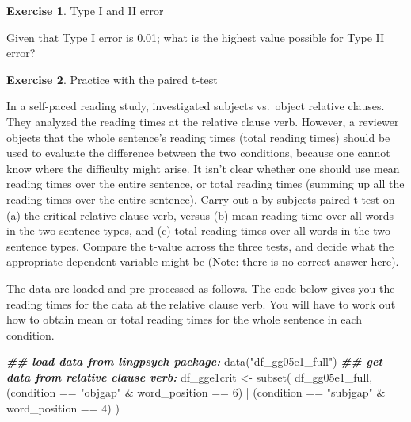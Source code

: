 \documentclass[
  12pt,
]{krantz}
\newenvironment{Shaded}{\begin{snugshade}}{\end{snugshade}}
\newcommand{\DecValTok}[1]{\textcolor[rgb]{0.00,0.00,0.81}{#1}}
\newcommand{\DocumentationTok}[1]{\textcolor[rgb]{0.56,0.35,0.01}{\textbf{\textit{#1}}}}
\newcommand{\FunctionTok}[1]{\textcolor[rgb]{0.00,0.00,0.00}{#1}}
\newcommand{\NormalTok}[1]{#1}
\newcommand{\OtherTok}[1]{\textcolor[rgb]{0.56,0.35,0.01}{#1}}
\newcommand{\SpecialCharTok}[1]{\textcolor[rgb]{0.00,0.00,0.00}{#1}}
\newcommand{\StringTok}[1]{\textcolor[rgb]{0.31,0.60,0.02}{#1}}
\theoremstyle{definition}
\theoremstyle{definition}
\theoremstyle{definition}
\newtheorem{exercise}{Exercise}[chapter]
\theoremstyle{definition}
\theoremstyle{remark}
\begin{document}
\begin{exercise}
\protect\hypertarget{exr:SamplingDistrnexercisestype1type2}{}\label{exr:SamplingDistrnexercisestype1type2}Type I and II error
\end{exercise}

Given that Type I error is 0.01; what is the highest value possible for Type II error?

\begin{exercise}
\protect\hypertarget{exr:SamplingDistrnexercisespairedttest}{}\label{exr:SamplingDistrnexercisespairedttest}Practice with the paired t-test
\end{exercise}

In a self-paced reading study, \citet{grodner} investigated subjects vs.~object relative clauses. They analyzed the reading times at the relative clause verb. However, a reviewer objects that the whole sentence's reading times (total reading times) should be used to evaluate the difference between the two conditions, because one cannot know where the difficulty might arise. It isn't clear whether one should use mean reading times over the entire sentence, or total reading times (summing up all the reading times over the entire sentence).
Carry out a by-subjects paired t-test on (a) the critical relative clause verb, versus (b) mean reading time over all words in the two sentence types, and (c) total reading times over all words in the two sentence types. Compare the t-value across the three tests, and decide what the appropriate dependent variable might be (Note: there is no correct answer here).

The data are loaded and pre-processed as follows. The code below gives you the reading times for the data at the relative clause verb. You will have to work out how to obtain mean or total reading times for the whole sentence in each condition.

\begin{Shaded}
\begin{Highlighting}[]
\DocumentationTok{\#\# load data from lingpsych package:}
\FunctionTok{data}\NormalTok{(}\StringTok{"df\_gg05e1\_full"}\NormalTok{)}
\DocumentationTok{\#\# get data from relative clause verb:}
\NormalTok{df\_gge1crit }\OtherTok{\textless{}{-}} \FunctionTok{subset}\NormalTok{(}
\NormalTok{  df\_gg05e1\_full,}
\NormalTok{  (condition }\SpecialCharTok{==} \StringTok{"objgap"} \SpecialCharTok{\&}
\NormalTok{    word\_position }\SpecialCharTok{==} \DecValTok{6}\NormalTok{) }\SpecialCharTok{|}
\NormalTok{    (condition }\SpecialCharTok{==} \StringTok{"subjgap"} \SpecialCharTok{\&}\NormalTok{ word\_position }\SpecialCharTok{==} \DecValTok{4}\NormalTok{)}
\NormalTok{)}
\end{Highlighting}
\end{Shaded}
\end{document}
